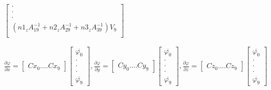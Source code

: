 \begin{equation}
\begin{gathered}
\begin{bmatrix}
    \cdot\\
    \cdot\\
    \cdot\\
    (n1_zA^{-1}_{19}+n2_zA^{-1}_{29}+n3_zA^{-1}_{39})V_9\\
    \end{bmatrix}\\
    \\
    \\
     \frac{\partial {\varphi}}{\partial x} = \begin{bmatrix}
    Cx_0....Cx_9
    \end{bmatrix} \begin{bmatrix}
    \overline{{\varphi}_0}\\
   \cdot\\
    \cdot\\
    \cdot\\
    \overline{{\varphi}_9}
    \end{bmatrix},
    \frac{\partial {\varphi}}{\partial y} = \begin{bmatrix}
    Cy_0....Cy_9
    \end{bmatrix} \begin{bmatrix}
    \overline{{\varphi}_0}\\
    \cdot\\
    \cdot\\
    \cdot\\
    \overline{{\varphi}_9}
    \end{bmatrix},
    \frac{\partial {\varphi}}{\partial z} = \begin{bmatrix}
    Cz_0....Cz_9
    \end{bmatrix} \begin{bmatrix}
    \overline{{\varphi}_0}\\
   \cdot\\
    \cdot\\
    \cdot\\
    \overline{{\varphi}_9}
    \end{bmatrix}
    \end{gathered}
\end{equation}


